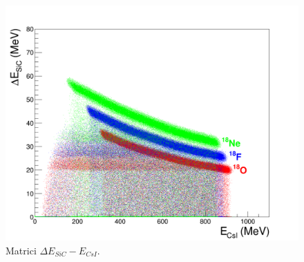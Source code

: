 \begin{figure} [!p]
	\centering
	\includegraphics[width=\textwidth, keepaspectratio]{Grafici_Tesi/Particelle_non_monocromatiche_Resid/deltaE_ERes.png}
	\caption{Matrici $\Delta E_{SiC} - E_{CsI}$.} \label{fig:deltaE_ERes}
\end{figure}






